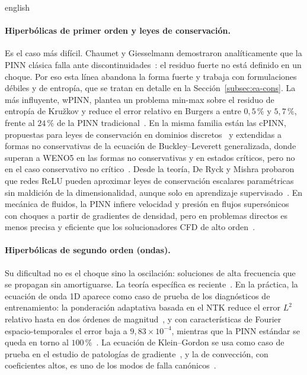 \documentclass[0000.tex]{subfiles}
\begin{document}
\begin{hyphenrules}{english}
\paragraph{Hiperbólicas de primer orden y leyes de conservación.} Es el caso más difícil. Chaumet y Giesselmann demostraron analíticamente que la PINN clásica falla ante discontinuidades~\cite{chaumet2024improving}: el residuo fuerte no está definido en un choque. Por eso esta línea abandona la forma fuerte y trabaja con formulaciones débiles y de entropía, que se tratan en detalle en la Sección~\ref{subsec:ea-cons}. La más influyente, wPINN, plantea un problema min-max sobre el residuo de entropía de Kružkov y reduce el error relativo en Burgers a entre $0{,}5\,\%$ y $5{,}7\,\%$, frente al $24\,\%$ de la PINN tradicional~\cite{de2024wpinns}. En la misma familia están las cPINN, propuestas para leyes de conservación en dominios discretos~\cite{jagtap2020conservative} y extendidas a formas no conservativas de la ecuación de Buckley--Leverett generalizada, donde superan a WENO5 en las formas no conservativas y en estados críticos, pero no en el caso conservativo no crítico~\cite{quita2023conservative}. Desde la teoría, De Ryck y Mishra probaron que redes ReLU pueden aproximar leyes de conservación escalares paramétricas sin maldición de la dimensionalidad, aunque solo en aprendizaje supervisado~\cite{de2024error}. En mecánica de fluidos, la PINN infiere velocidad y presión en flujos supersónicos con choques a partir de gradientes de densidad, pero en problemas directos es menos precisa y eficiente que los solucionadores CFD de alto orden~\cite{cai2021physics}.

\paragraph{Hiperbólicas de segundo orden (ondas).} Su dificultad no es el choque sino la oscilación: soluciones de alta frecuencia que se propagan sin amortiguarse. La teoría específica es reciente~\cite{qian2023error}. En la práctica, la ecuación de onda 1D aparece como caso de prueba de los diagnósticos de entrenamiento: la ponderación adaptativa basada en el NTK reduce el error $L^2$ relativo hasta en dos órdenes de magnitud~\cite{wang2022and}, y con características de Fourier espacio-temporales el error baja a $9{,}83\times10^{-4}$, mientras que la PINN estándar se queda en torno al $100\,\%$~\cite{wang2021eigenvector}. La ecuación de Klein--Gordon se usa como caso de prueba en el estudio de patologías de gradiente~\cite{wang2021understanding}, y la de convección, con coeficientes altos, es uno de los modos de falla canónicos~\cite{krishnapriyan2021characterizing,rathore2024challenges}.


\end{hyphenrules}
\end{document}
